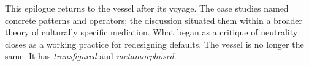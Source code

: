 


This epilogue returns to the vessel after its voyage. The case studies named concrete patterns and operators; the discussion situated them within a broader theory of culturally specific mediation. What began as a critique of neutrality closes as a working practice for redesigning defaults. The vessel is no longer the same. It has \textit{transfigured} and \textit{metamorphosed}.

